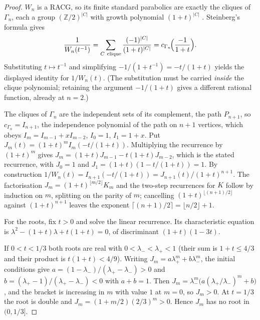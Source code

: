 \documentclass[11pt]{article}
\newcommand{\Z}{\mathbb{Z}}
\theoremstyle{definition}
\begin{document}
\begin{proof}
$W_n$ is a RACG, so its finite standard parabolics are exactly the cliques of $\Gamma_n$, each a group
$(\Z/2)^{|C|}$ with growth polynomial $(1+t)^{|C|}$ \cite{Davis}. Steinberg's formula
\cite{Steinberg,Bourbaki} gives
\[
   \frac{1}{W_n(t^{-1})}=\sum_{C\ \mathrm{clique}}\frac{(-1)^{|C|}}{(1+t)^{|C|}}
   =c_{\Gamma_n}\!\Bigl(\frac{-1}{1+t}\Bigr).
\]
Substituting $t\mapsto t^{-1}$ and simplifying $-1/(1+t^{-1})=-t/(1+t)$ yields the displayed identity for
$1/W_n(t)$. (The substitution must be carried \emph{inside} the clique polynomial; retaining the argument
$-1/(1+t)$ gives a different rational function, already at $n=2$.)

The cliques of $\Gamma_n$ are the independent sets of its complement, the path $P_{n+1}$, so
$c_{\Gamma_n}=I_{n+1}$, the independence polynomial of the path on $n+1$ vertices, which obeys
$I_m=I_{m-1}+xI_{m-2}$, $I_0=1$, $I_1=1+x$. Put $J_m(t)=(1+t)^mI_m(-t/(1+t))$. Multiplying the
recurrence by $(1+t)^m$ gives $J_m=(1+t)J_{m-1}-t(1+t)J_{m-2}$, which is the stated recurrence, with
$J_0=1$ and $J_1=(1+t)(1-t/(1+t))=1$. By construction $1/W_n(t)=I_{n+1}(-t/(1+t))=J_{n+1}(t)/(1+t)^{n+1}$.
The factorisation $J_m=(1+t)^{\lfloor m/2\rfloor}K_m$ and the two-step recurrences for $K$ follow by
induction on $m$, splitting on the parity of $m$; cancelling $(1+t)^{\lfloor (n+1)/2\rfloor}$ against
$(1+t)^{n+1}$ leaves the exponent $\lceil (n+1)/2\rceil=\lfloor n/2\rfloor+1$.

For the roots, fix $t>0$ and solve the linear recurrence. Its characteristic equation is
$\lambda^2-(1+t)\lambda+t(1+t)=0$, of discriminant $(1+t)(1-3t)$.

If $0<t<1/3$ both roots are real with $0<\lambda_-<\lambda_+<1$ (their sum is $1+t\le4/3$ and their
product is $t(1+t)<4/9$). Writing $J_m=a\lambda_+^m+b\lambda_-^m$, the initial conditions give
$a=(1-\lambda_-)/(\lambda_+-\lambda_-)>0$ and $b=(\lambda_+-1)/(\lambda_+-\lambda_-)<0$ with $a+b=1$.
Then $J_m=\lambda_-^m\bigl(a(\lambda_+/\lambda_-)^m+b\bigr)$, and the bracket is increasing in $m$ with
value $1$ at $m=0$, so $J_m>0$. At $t=1/3$ the root is double and $J_m=(1+m/2)(2/3)^m>0$. Hence $J_m$
has no root in $(0,1/3]$.


\end{proof}
\end{document}
